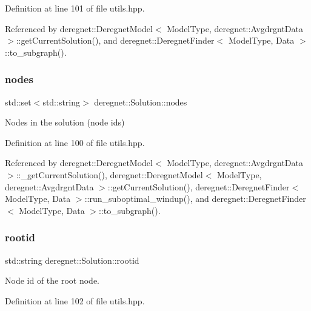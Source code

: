 Definition at line 101 of file utils.\+hpp.



Referenced by deregnet\+::\+Deregnet\+Model$<$ Model\+Type, deregnet\+::\+Avgdrgnt\+Data $>$\+::get\+Current\+Solution(), and deregnet\+::\+Deregnet\+Finder$<$ Model\+Type, Data $>$\+::to\+\_\+subgraph().

\mbox{\label{structderegnet_1_1Solution_a581de4de354d10149c7b9c0816c70840}} 
\subsubsection{\texorpdfstring{nodes}{nodes}}
{\footnotesize\ttfamily std\+::set$<$std\+::string$>$ deregnet\+::\+Solution\+::nodes}



Nodes in the solution (node id\textquotesingle{}s) 



Definition at line 100 of file utils.\+hpp.



Referenced by deregnet\+::\+Deregnet\+Model$<$ Model\+Type, deregnet\+::\+Avgdrgnt\+Data $>$\+::\+\_\+get\+Current\+Solution(), deregnet\+::\+Deregnet\+Model$<$ Model\+Type, deregnet\+::\+Avgdrgnt\+Data $>$\+::get\+Current\+Solution(), deregnet\+::\+Deregnet\+Finder$<$ Model\+Type, Data $>$\+::run\+\_\+suboptimal\+\_\+windup(), and deregnet\+::\+Deregnet\+Finder$<$ Model\+Type, Data $>$\+::to\+\_\+subgraph().

\mbox{\label{structderegnet_1_1Solution_a1aca697c0ec5e039837094cb45731215}} 
\subsubsection{\texorpdfstring{rootid}{rootid}}
{\footnotesize\ttfamily std\+::string deregnet\+::\+Solution\+::rootid}



Node id of the root node. 



Definition at line 102 of file utils.\+hpp.




